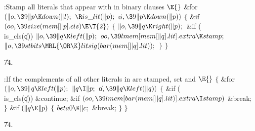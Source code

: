 \B{}:Stamp all literals that appear with  in binary clauses%
\X${}\E{}$\6
\&{for} ${}(\|o,\39\|p\K\\{down}(\|l);{}$ ${}\R\\{is\_lit}(\|p);{}$ \|o${},\39%
\|p\K\\{down}(\|p)){}$\5
${}\{{}$\1\6
\&{if} ${}(\\{oo},\39\\{size}(\\{mem}[\|p].\\{cls})\E\T{2}){}$\5
${}\{{}$\1\6
${}\|o,\39\|q\K\\{right}(\|p);{}$\6
\&{if} (\\{is\_cls}(\|q))\1\5
${}\|o,\39\|q\K\\{left}(\|p);{}$\2\6
${}\\{oo},\39\\{lmem}[\\{mem}[\|q].\\{lit}].\\{extra}\K\\{stamp};{}$\6
${}\|o,\39\\{stbits}\MRL{{\OR}{\K}}\\{litsig}(\\{bar}(\\{mem}[\|q].%
\\{lit}));{}$\6
\4${}\}{}$\2\6
\4${}\}{}$\2\par
\U74.\fi

\B{}:If the complements of all other literals in  are stamped,
set  and \X${}\E{}$\6
${}\{{}$\1\6
\&{for} ${}(\|o,\39\|q\K\\{left}(\|p);{}$ ${}\|q\I\|p;{}$ \|o${},\39\|q\K%
\\{left}(\|q)){}$\5
${}\{{}$\1\6
\&{if} (\\{is\_cls}(\|q))\1\5
\&{continue};\2\6
\&{if} ${}(\\{oo},\39\\{lmem}[\\{bar}(\\{mem}[\|q].\\{lit})].\\{extra}\I%
\\{stamp}){}$\1\5
\&{break};\2\6
\4${}\}{}$\2\6
\&{if} ${}(\|q\E\|p){}$\5
${}\{{}$\1\6
${}\\{beta0}\K\|c;{}$\6
\&{break};\6
\4${}\}{}$\2\6
\4${}\}{}$\2\par
\U74.\fi

